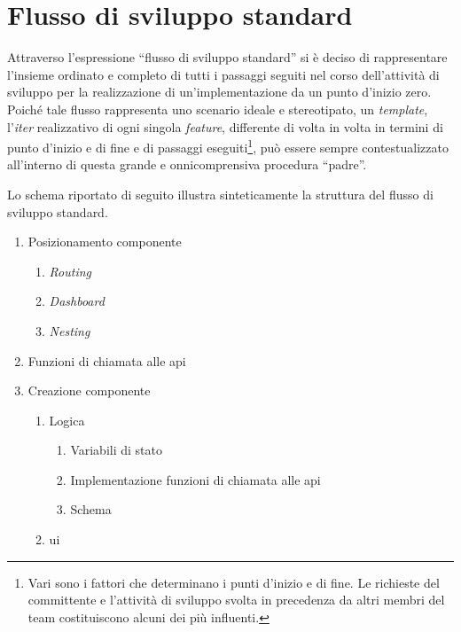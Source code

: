 \section{Flusso di sviluppo standard}
\label{sec:Flusso di sviluppo standard}
Attraverso l'espressione “flusso di sviluppo standard” si è deciso di rappresentare l'insieme ordinato e completo di tutti i passaggi seguiti nel corso dell'attività di sviluppo per la realizzazione di un'implementazione da un punto d'inizio zero.\\
Poiché tale flusso rappresenta uno scenario ideale e stereotipato, un \textit{template}, l'\textit{iter} realizzativo di ogni singola \textit{feature}, differente di volta in volta in termini di punto d'inizio e di fine e di passaggi eseguiti\footnote{Vari sono i fattori che determinano i punti d'inizio e di fine. Le richieste del committente e l'attività di sviluppo svolta in precedenza da altri membri del team costituiscono alcuni dei più influenti.}, può essere sempre contestualizzato all'interno di questa grande e onnicomprensiva procedura “padre”.

Lo schema riportato di seguito illustra sinteticamente la struttura del flusso di sviluppo standard.
\begin{enumerate}
    \item Posizionamento componente
        \begin{enumerate}
            \item \textit{Routing}
            \item \textit{Dashboard}
            \item \textit{Nesting}
        \end{enumerate}
    \item Funzioni di chiamata alle \gls{api} 
    \item Creazione componente
        \begin{enumerate}
            \item Logica
                \begin{enumerate}
                    \item Variabili di stato
                    \item Implementazione funzioni di chiamata alle \gls{api}
                    \item Schema
                \end{enumerate}
            \item \acrshort{ui}
        \end{enumerate}
\end{enumerate}


